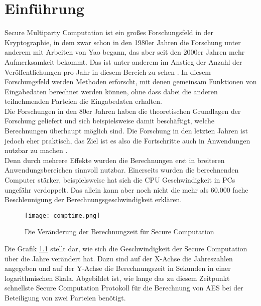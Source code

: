 \chapter{Einführung}
Secure Multiparty Computation ist ein großes Forschungsfeld in der Kryptographie, in dem zwar schon in den 1980er Jahren die Forschung unter anderem mit Arbeiten von Yao \cite{Yao1982} begann, das aber seit den 2000er Jahren mehr Aufmerksamkeit bekommt. Das ist unter anderem im Anstieg der Anzahl der Veröffentlichungen pro Jahr in diesem Bereich zu sehen \cite{Kogan2021}. 
In diesem Forschungsfeld werden Methoden erforscht, mit denen gemeinsam Funktionen von Eingabedaten berechnet werden können, ohne dass dabei die anderen teilnehmenden Parteien die Eingabedaten erhalten.\\
Die Forschungen in den 80er Jahren haben die theoretischen Grundlagen der Forschung geliefert und sich beispielsweise damit beschäftigt, welche Berechnungen überhaupt möglich sind. Die Forschung in den letzten Jahren ist jedoch eher praktisch, das Ziel ist es also die Fortschritte auch in Anwendungen nutzbar zu machen \cite{Kogan2021}.\\
Denn durch mehrere Effekte wurden die Berechnungen erst in breiteren Anwendungsbereichen sinnvoll nutzbar. Einerseits wurden die berechnenden Computer stärker, beispielsweise hat sich die CPU Geschwindigkeit in PCs ungefähr verdoppelt. Das allein kann aber noch nicht die mehr als 60.000 fache Beschleunigung der Berechnungsgeschwindigkeit erklären. \cite{Kogan2021}
\begin{figure}[H]
\begin{center}
\texttt{[image: comptime.png]}
\caption{Die Veränderung der Berechnungzeit für Secure Computation\\}
\cite{Kogan2021}
\label{evolution_of_computation}
\end{center}

\end{figure}

Die Grafik \ref{evolution_of_computation} stellt dar, wie sich die Geschwindigkeit der Secure Computation über die Jahre verändert hat.
Dazu sind auf der X-Achse die Jahreszahlen angegeben und auf der Y-Achse die Berechnungszeit in Sekunden in einer logarithmischen Skala. Abgebildet ist, wie lange das zu diesem Zeitpunkt schnellste Secure Computation Protokoll für die Berechnung von AES bei der Beteiligung von zwei Parteien benötigt.\\

